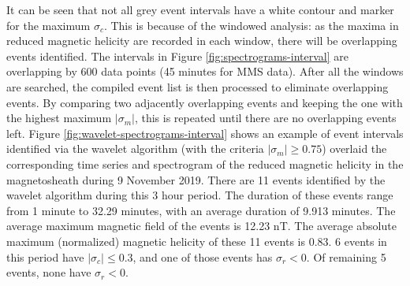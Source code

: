 It can be seen that not all grey event intervals have a white contour and marker for the maximum $\sigma_c$. This is because of the windowed analysis: as the maxima in reduced magnetic helicity are recorded in each window, there will be overlapping events identified. The intervals in Figure \ref{fig:spectrograms-interval} are overlapping by 600 data points (45 minutes for MMS data). After all the windows are searched, the compiled event list is then processed to eliminate overlapping events. By comparing two adjacently overlapping events and keeping the one with the highest maximum $|\sigma_m|$, this is repeated until there are no overlapping events left. Figure \ref{fig:wavelet-spectrograms-interval} shows an example of event intervals identified via the wavelet algorithm (with the criteria $|\sigma_m|\geq 0.75$) overlaid the corresponding time series and spectrogram of the reduced magnetic helicity in the magnetosheath during 9 November 2019. There are 11 events identified by the wavelet algorithm during this 3 hour period. The duration of these events range from 1 minute to 32.29 minutes, with an average duration of 9.913 minutes. The average maximum magnetic field of the events is 12.23 nT. The average absolute maximum (normalized) magnetic helicity of these 11 events is 0.83. 6 events in this period have $|\sigma_c|\leq 0.3$, and one of those events has $\sigma_r<0$. Of remaining 5 events, none have $\sigma_r<0$.

